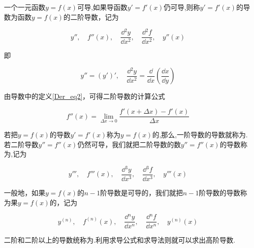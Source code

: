 


一个一元函数$y=f(x)$可导,如果导函数$y'=f'(x)$仍可导,则称$y'=f'(x)$的导数为函数$y=f(x)$的二阶导数，记为

\begin{equation}
y'',\quad f''(x),\quad \frac{\dd{^2y}}{\dd{x^2}},\quad \frac{\dd{^2f}}{\dd{x^2}},\quad y''(x)
\end{equation}

即

\begin{equation}
y''=(y')',\quad\frac{\dd{^2y}}{\dd{x^2}}=\frac{\dd{ }}{\dd{x}}(\frac{\dd{x}}{\dd{y}})
\end{equation}

由导数中的定义\autoref{Der_eq2}，可得二阶导数的计算公式

\begin{equation}
f''(x)=\lim_{\Delta x \to 0} \frac{f'(x+ \Delta x)-f'(x)}{\Delta x}
\end{equation}

若把$y=f(x)$的导数$y'=f'(x)$称为$y=f(x)$的,那么,一阶导数的导数就称为.若二阶导数$y''=f''(x)$仍然可导，我们就把二阶导数的数$y''=f''(x)$的导数称为,记为

\begin{equation}
y''',\quad f'''(x),\quad \frac{\dd{^3y}}{\dd{x^3}},\quad \frac{\dd{^3f}}{\dd{x^3}},\quad y'''(x)
\end{equation}

一般地，如果$y=f(x)$的$n-1$阶导数是可导的，我们就把$n-1$阶导数的导数称为果$y=f(x)$的，记为

\begin{equation}
y^{(n)},\quad f^{(n)}(x),\quad \frac{\dd{^ny}}{\dd{x^n}},\quad \frac{\dd{^nf}}{\dd{x^n}},\quad y^{(n)}(x)
\end{equation}

二阶和二阶以上的导数统称为.利用求导公式和求导法则就可以求出高阶导数.















